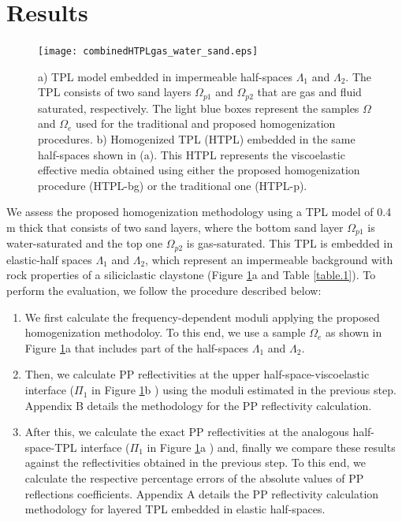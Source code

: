 \documentclass[draft]{agujournal2019}
\begin{document}
\section{Results}
\begin{figure}[!ht]
\centering
        \texttt{[image: combinedHTPLgas\_water\_sand.eps]}
\caption{
a)
TPL model embedded in impermeable half-spaces $\Lambda_1$ and $\Lambda_2$. The TPL consists of two sand layers  $\Omega_{p1}$  and $\Omega_{p2}$ that are gas and fluid saturated, respectively. The light blue boxes represent the samples $\Omega$ and $\Omega_e$ used for the traditional and proposed homogenization procedures. b) Homogenized TPL (HTPL) embedded in the same half-spaces shown in (a). This HTPL represents the viscoelastic effective media obtained using either the proposed homogenization procedure (HTPL-bg) or the traditional one (HTPL-p). }
\label{fig.2}
\end{figure}

We assess the proposed homogenization methodology using a TPL model of 0.4 m thick that consists of two sand layers, where the bottom sand layer $\Omega_{p1}$ is water-saturated and the top one $\Omega_{p2}$ is gas-saturated. This TPL is embedded 
in elastic-half spaces $\Lambda_1$ and $\Lambda_2$, which represent an impermeable background  with rock properties of a siliciclastic claystone (Figure \ref{fig.2}a and Table \ref{table.1}). To perform the evaluation, we follow the procedure described below: 
\begin{enumerate}
    \item We first calculate the frequency-dependent moduli applying the proposed homogenization methodoloy. To this end, we use a sample $\Omega_e$ as shown in Figure \ref{fig.2}a that includes part of the half-spaces $\Lambda_1$ and $\Lambda_2$. 
    
    \item Then, we calculate PP reflectivities at the upper half-space-viscoelastic interface  ($\Pi_1$ in Figure \ref{fig.2}b ) using the moduli estimated in the previous step. Appendix B details the methodology for the PP reflectivity calculation.
    
    \item After this, we calculate the exact PP reflectivities at the analogous half-space-TPL interface ($\Pi_1$ in Figure \ref{fig.2}a ) and, finally we compare these results against the reflectivities obtained in the previous step. To this end, we calculate the respective percentage errors of the absolute values of PP reflections coefficients. Appendix A details the PP reflectivity calculation methodology for layered TPL embedded in elastic half-spaces.
\end{enumerate}
\end{document}
